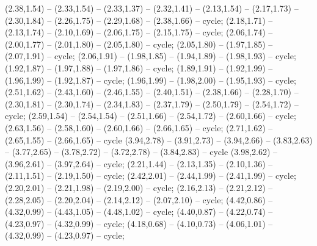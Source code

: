 { (2.38,1.54) -- (2.33,1.54) -- (2.33,1.37) -- (2.32,1.41) -- (2.13,1.54) -- (2.17,1.73) -- (2.30,1.84) -- (2.26,1.75) -- (2.29,1.68) -- (2.38,1.66) -- cycle;
 (2.18,1.71) -- (2.13,1.74) -- (2.10,1.69) -- (2.06,1.75) -- (2.15,1.75) -- cycle;
 (2.06,1.74) -- (2.00,1.77) -- (2.01,1.80) -- (2.05,1.80) -- cycle;
 (2.05,1.80) -- (1.97,1.85) -- (2.07,1.91) -- cycle;
 (2.06,1.91) -- (1.98,1.85) -- (1.94,1.89) -- (1.98,1.93) -- cycle;
 (1.92,1.87) -- (1.97,1.88) -- (1.97,1.86) -- cycle;
 (1.89,1.91) -- (1.92,1.99) -- (1.96,1.99) -- (1.92,1.87) -- cycle;
 (1.96,1.99) -- (1.98,2.00) -- (1.95,1.93) -- cycle;
 (2.51,1.62) -- (2.43,1.60) -- (2.46,1.55) -- (2.40,1.51) -- (2.38,1.66) -- (2.28,1.70) -- (2.30,1.81) -- (2.30,1.74) -- (2.34,1.83) -- (2.37,1.79) -- (2.50,1.79) -- (2.54,1.72) -- cycle;
 (2.59,1.54) -- (2.54,1.54) -- (2.51,1.66) -- (2.54,1.72) -- (2.60,1.66) -- cycle;
 (2.63,1.56) -- (2.58,1.60) -- (2.60,1.66) -- (2.66,1.65) -- cycle;
 (2.71,1.62) -- (2.65,1.55) -- (2.66,1.65) -- cycle (3.94,2.78) -- (3.91,2.73) -- (3.94,2.66) -- (3.83,2.63) -- (3.77,2.65) -- (3.78,2.72) -- (3.72,2.78) -- (3.84,2.83) -- cycle (3.98,2.62) -- (3.96,2.61) -- (3.97,2.64) -- cycle;
 (2.21,1.44) -- (2.13,1.35) -- (2.10,1.36) -- (2.11,1.51) -- (2.19,1.50) -- cycle;
 (2.42,2.01) -- (2.44,1.99) -- (2.41,1.99) -- cycle;
 (2.20,2.01) -- (2.21,1.98) -- (2.19,2.00) -- cycle;
 (2.16,2.13) -- (2.21,2.12) -- (2.28,2.05) -- (2.20,2.04) -- (2.14,2.12) -- (2.07,2.10) -- cycle;
 (4.42,0.86) -- (4.32,0.99) -- (4.43,1.05) -- (4.48,1.02) -- cycle;
 (4.40,0.87) -- (4.22,0.74) -- (4.23,0.97) -- (4.32,0.99) -- cycle;
 (4.18,0.68) -- (4.10,0.73) -- (4.06,1.01) -- (4.32,0.99) -- (4.23,0.97) -- cycle;
}
